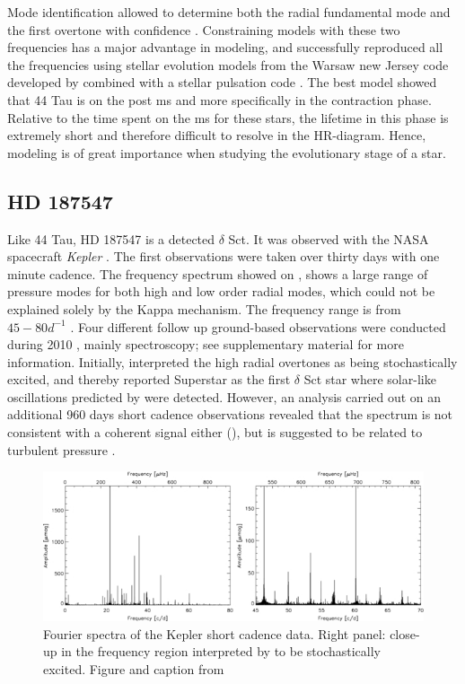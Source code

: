 Mode identification allowed to determine both the radial fundamental mode and the first overtone with confidence \citet{lenz2008asteroseismic}. Constraining models with these two frequencies has a major advantage in modeling, and \citet{lenz2010delta} successfully reproduced all the frequencies using stellar evolution models from the Warsaw new Jersey code developed by combined with a stellar pulsation code \citep{paczynski1969envelopes}. The best model showed that 44 Tau is on the post ms and more specifically in the contraction phase. Relative to the time spent on the ms for these stars, the lifetime in this phase is extremely short and therefore difficult to resolve in the HR-diagram. Hence, modeling is of great importance when studying the evolutionary stage of a star. 
\\


\subsection{HD 187547}

Like 44 Tau, HD 187547 is a detected $\delta$ Sct. It was observed  with the NASA spacecraft \textit{Kepler} \citet{koch2010kepler}. The first observations were taken over thirty days with one minute cadence. The frequency spectrum showed on , shows a large range of pressure modes for both high and low order radial modes, which could not be explained solely by the Kappa mechanism. The frequency range is from $45-80 d^{-1}$ . Four different follow up ground-based observations were conducted during 2010 \citet{antoci2011excitation}, mainly spectroscopy; see \citet{antoci2011excitation} supplementary material for more information. Initially, \citet{antoci2011excitation} interpreted the high radial overtones as being stochastically excited, and thereby reported Superstar as the first $\delta$ Sct star where solar-like oscillations predicted by \citet{houdek1999, samadi2002} were detected.  However, an analysis carried out on an additional 960 days short cadence observations revealed that the spectrum is not consistent with a coherent signal either (), but is suggested to be related to turbulent pressure \citep{antoci2014role}. 

\begin{figure}[htbp]
    \centering
    \includegraphics[width=1\textwidth]{superstarspectrum.jpg}
    \caption{Fourier spectra of the Kepler short cadence data. Right panel: close-up in the frequency region interpreted by \citet{antoci2011solar} to be stochastically excited. Figure and caption from \citet{antoci2014role}}
    \label{ssspectrum}
\end{figure}

